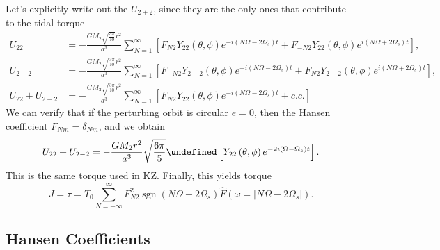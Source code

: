 \documentclass[11pt,
        usenames, %
        dvipsnames %
    ]{article}
\newcommand*{\abs}[1]{\left|#1\right|}
\newcommand*{\p}[1]{\left(#1\right)}
\newcommand*{\s}[1]{\left[#1\right]}
\let\Re\undefined
\DeclareMathOperator{\Re}{Re}
\DeclareMathOperator{\sgn}{sgn}
\begin{document}
Let's explicitly write out the $U_{2\pm 2}$, since they are the only ones that
contribute to the tidal torque
\begin{align}
    U_{22} &= -\frac{GM_2 \sqrt{\frac{3\pi}{10}}r^2}{a^3}
        \sum\limits_{N = 1}^\infty \s{
            F_{N2}Y_{22}\p{\theta, \phi}e^{-i\p{N\Omega - 2\Omega_s}t}
            + F_{-N2}Y_{22}\p{\theta, \phi}e^{i\p{N\Omega + 2\Omega_s}t}},\\
    U_{2-2} &= -\frac{GM_2 \sqrt{\frac{3\pi}{10}} r^2}{a^3}
        \sum\limits_{N = 1}^\infty \s{
            F_{-N2}Y_{2-2}\p{\theta, \phi}e^{-i\p{N\Omega - 2\Omega_s}t}
            + F_{N2}Y_{2-2}\p{\theta, \phi}e^{i\p{N\Omega + 2\Omega_s}t}},\\
    U_{22} + U_{2-2} &= -\frac{GM_2 \sqrt{\frac{3\pi}{10}} r^2}{a^3}
        \sum\limits_{N = 1}^\infty \s{
            F_{N2}Y_{22}\p{\theta, \phi}e^{-i\p{N\Omega - 2\Omega_s}t}
            + c.c.}
\end{align}
We can verify that if the perturbing orbit is circular $e = 0$, then the Hansen
coefficient $F_{Nm} = \delta_{Nm}$, and we obtain
\begin{equation}
    U_{22} + U_{2-2} = -\frac{GM_2r^2}{a^3}\sqrt{\frac{6\pi}{5}}
        \Re \s{Y_{22}\p{\theta, \phi}e^{-2i\p{\Omega - \Omega_s}t}}.
\end{equation}
This is the same torque used in KZ\@. Finally, this yields torque
\begin{equation}
    \dot{J} = \tau = T_0 \sum\limits_{N = -\infty}^\infty
        F_{N2}^2 \sgn\p{N\Omega - 2\Omega_s} \hat{F}
            \p{\omega = \abs{N\Omega - 2\Omega_s}}.
\end{equation}

\subsection{Hansen Coefficients}
\end{document}
